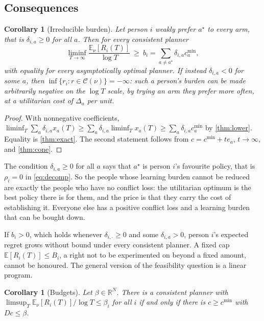 \documentclass[11pt,a4paper]{article}
\theoremstyle{plain}
\newtheorem{corollary}[theorem]{Corollary}
\theoremstyle{definition}
\theoremstyle{remark}
\newcommand{\E}{\mathbb{E}}
\newcommand{\R}{\mathbb{R}}
\newcommand{\cmin}{c^{\min}}
\newcommand{\astar}{a^\star}
\begin{document}
\subsection{Consequences}

\begin{corollary}[Irreducible burden]\label{cor:irreducible}
Let person $i$ weakly prefer $\astar$ to every arm, that is $\delta_{i,a}\ge0$ for all $a$. Then for every consistent planner
\[
  \liminf_{T\to\infty}\frac{\E_\nu[R_i(T)]}{\log T}\ \ge\ b_i=\sum_{a\neq\astar}\delta_{i,a}\cmin_a,
\]
with equality for every asymptotically optimal planner. If instead $\delta_{i,a}<0$ for some $a$, then $\inf\{r_i: r\in\mathcal C(\nu)\}=-\infty$: such a person's burden can be made arbitrarily negative on the $\log T$ scale, by trying an arm they prefer more often, at a utilitarian cost of $\Delta_a$ per unit.
\end{corollary}

\begin{proof}
With nonnegative coefficients, $\liminf_T\sum_a\delta_{i,a}x_a(T)\ge\sum_a\delta_{i,a}\liminf_Tx_a(T)\ge\sum_a\delta_{i,a}\cmin_a$ by \cref{thm:lower}. Equality is \cref{thm:exact}. The second statement follows from $c=\cmin+te_a$, $t\to\infty$, and \cref{thm:cone}.
\end{proof}

The condition $\delta_{i,a}\ge0$ for all $a$ says that $\astar$ is person $i$'s favourite policy, that is $\rho_i=0$ in \eqref{eq:decomp}. So the people whose learning burden cannot be reduced are exactly the people who have no conflict loss: the utilitarian optimum is the best policy there is for them, and the price is that they carry the cost of establishing it. Everyone else has a positive conflict loss and a learning burden that can be bought down.

If $b_i>0$, which holds whenever $\delta_{i,\cdot}\ge0$ and some $\delta_{i,a}>0$, person $i$'s expected regret grows without bound under every consistent planner. A fixed cap $\E[R_i(T)]\le B_i$, a right not to be experimented on beyond a fixed amount, cannot be honoured. The general version of the feasibility question is a linear program.

\begin{corollary}[Budgets]\label{cor:budget}
Let $\beta\in\R^N$. There is a consistent planner with $\limsup_T\E_\nu[R_i(T)]/\log T\le\beta_i$ for all $i$ if and only if there is $c\ge\cmin$ with $Dc\le\beta$.
\end{corollary}
\end{document}
